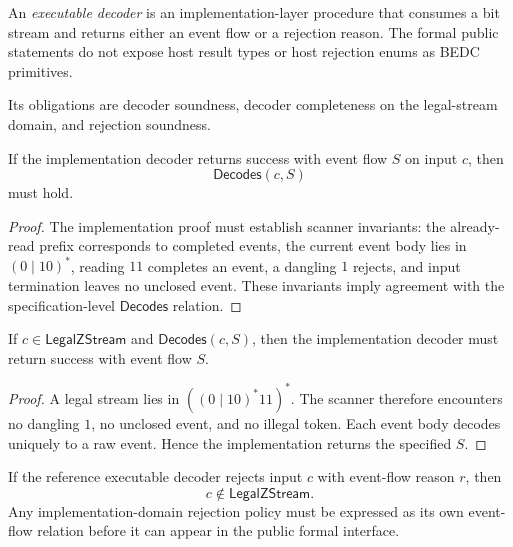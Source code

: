 \begin{definition}
\label{def:implementation-interface-executable-decoder}
An \emph{executable decoder} is an implementation-layer procedure that consumes a bit stream and returns either an event flow or a rejection reason. The formal public statements do not expose host result types or host rejection enums as BEDC primitives.

Its obligations are decoder soundness, decoder completeness on the legal-stream domain, and rejection soundness.
\end{definition}

\begin{theorem}
\label{thm:implementation-interface-decoder-soundness-obligation}
If the implementation decoder returns success with event flow $S$ on input $c$, then
$$
  \mathsf{Decodes}(c,S)
$$
must hold.
\end{theorem}

\begin{proof}
The implementation proof must establish scanner invariants: the already-read prefix corresponds to completed events, the current event body lies in $(0\mid 10)^{\ast}$, reading $11$ completes an event, a dangling $1$ rejects, and input termination leaves no unclosed event. These invariants imply agreement with the specification-level $\mathsf{Decodes}$ relation.
\end{proof}

\begin{theorem}
\label{thm:implementation-interface-decoder-completeness-obligation}
If $c\in\mathsf{LegalZStream}$ and $\mathsf{Decodes}(c,S)$, then the implementation decoder must return success with event flow $S$.
\end{theorem}

\begin{proof}
A legal stream lies in $((0\mid 10)^{\ast}11)^{\ast}$. The scanner therefore encounters no dangling $1$, no unclosed event, and no illegal token. Each event body decodes uniquely to a raw event. Hence the implementation returns the specified $S$.
\end{proof}

\begin{theorem}
\label{thm:implementation-interface-reject-soundness-obligation}
If the reference executable decoder rejects input $c$ with event-flow reason $r$, then
$$
  c\notin\mathsf{LegalZStream}.
$$
Any implementation-domain rejection policy must be expressed as its own event-flow relation before it can appear in the public formal interface.
\end{theorem}

